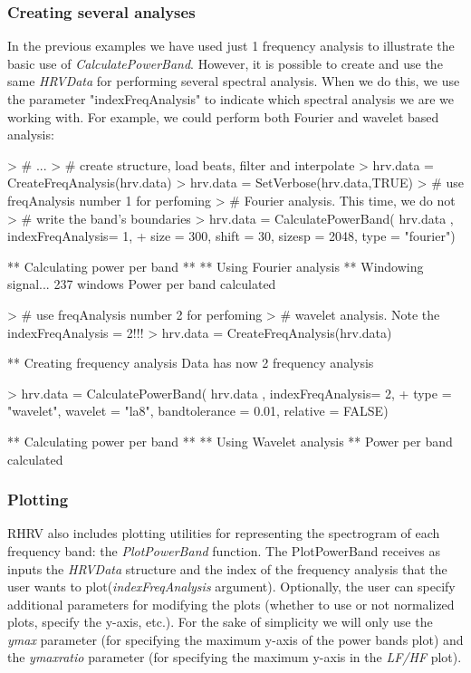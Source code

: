 \documentclass[12pt,lot, lof]{puthesis}
\begin{document}
\subsubsection{Creating several analyses} In the previous examples we have used 
just 1 frequency analysis to 
illustrate the basic use of \textit{CalculatePowerBand}. However, it is 
possible to create and use
the same \textit{HRVData} for performing several spectral analysis. When we do 
this, we use the parameter  "indexFreqAnalysis" to indicate which spectral 
analysis we are we working with. For example, we could perform both
Fourier and wavelet based analysis:
\begin{Schunk}
\begin{Sinput}
> # ...
> # create structure, load beats, filter and interpolate
> hrv.data = CreateFreqAnalysis(hrv.data)
> hrv.data = SetVerbose(hrv.data,TRUE)
> # use freqAnalysis number 1 for perfoming 
> # Fourier analysis. This time, we do not
> # write the band's boundaries
> hrv.data = CalculatePowerBand( hrv.data , indexFreqAnalysis= 1,
+ size = 300, shift = 30, sizesp = 2048, type = "fourier")
\end{Sinput}
\begin{Soutput}
** Calculating power per band **
** Using Fourier analysis **
   Windowing signal... 237 windows 
Power per band calculated
\end{Soutput}
\begin{Sinput}
> # use freqAnalysis number 2 for perfoming 
> # wavelet analysis. Note the indexFreqAnalysis = 2!!!
> hrv.data = CreateFreqAnalysis(hrv.data)
\end{Sinput}
\begin{Soutput}
** Creating frequency analysis
   Data has now 2 frequency analysis
\end{Soutput}
\begin{Sinput}
> hrv.data = CalculatePowerBand( hrv.data , indexFreqAnalysis= 2,
+  type = "wavelet", wavelet = "la8", bandtolerance = 0.01, relative = FALSE)
\end{Sinput}
\begin{Soutput}
** Calculating power per band **
** Using Wavelet analysis **
Power per band calculated
\end{Soutput}
\end{Schunk}


\subsubsection{Plotting} RHRV also includes plotting utilities for representing 
the spectrogram of each frequency band: the \textit{PlotPowerBand} function. 
The {PlotPowerBand} receives as inputs the \textit{HRVData}
structure and the index of the frequency analysis that the user wants to 
plot(\textit{indexFreqAnalysis} argument). Optionally, the user can specify 
additional parameters for modifying the plots (whether to use or not normalized 
plots, specify the y-axis, etc.). For the sake of simplicity we will only use 
the \textit{ymax} parameter (for specifying the maximum y-axis of the power 
bands plot) and the \textit{ymaxratio} parameter
 (for specifying the maximum y-axis in the \textit{LF/HF} plot).\\
\end{document}
